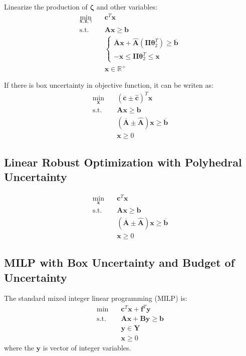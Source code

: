 \documentclass[fleqn,10pt]{wlscirep}
\begin{document}
Linearize the production of $\boldsymbol{\zeta}$ and other variables:
\begin{align}
    \min_{\mathbf{x}, \mathbf{z}, \gamma} \quad& \mathbf{c}^{T} \mathbf{x} \\
    \text{s.t.} \quad & \mathbf{A} \mathbf{x} \geq \mathbf{b} \\ 
    & \begin{cases}
        \overline{\mathbf{A}} \mathbf{x} + \hat{\mathbf{A}} \left(\mathbf{II} \boldsymbol{\theta}_{2}^{T} \right) \geq \overline{\mathbf{b}} \\
        - \mathbf{x} \leq \mathbf{II} \boldsymbol{\theta}_{2}^{T} \leq \mathbf{x}
    \end{cases} \\
    & \mathbf{x} \in \mathbb{R}^{+}
\end{align}

If there is box uncertainty in objective function, it can be writen as:
\begin{align}
    \min_{\mathbf{x}} \quad & \left(\overline{\mathbf{c}} \pm \hat{\mathbf{c}} \right)^T \mathbf{x} \\
    \text{s.t.} \quad & \mathbf{A} \mathbf{x} \geq \mathbf{b} \\
    & \left(\overline{\mathbf{A}} \pm \widehat{\mathbf{A}} \right) \mathbf{x} \geq \overline{\mathbf{b}} \\
    & \mathbf{x} \geq 0
\end{align}

\subsection{Linear Robust Optimization with Polyhedral Uncertainty}

\begin{align}
    \min_{\mathbf{x}} \quad & \mathbf{c}^T \mathbf{x} \\
    \text{s.t.} \quad & \mathbf{A} \mathbf{x} \geq \mathbf{b} \\
    & \left(\overline{\mathbf{A}} \pm \widehat{\mathbf{A}} \right) \mathbf{x} \geq \overline{\mathbf{b}} \\
    & \mathbf{x} \geq 0
\end{align}

\subsection{MILP with Box Uncertainty and Budget of Uncertainty}

The standard mixed integer linear programming (MILP) is:
\begin{align}
    \min \quad& \mathbf{c}^{T} \mathbf{x} + \mathbf{f}^{T} \mathbf{y} \label{eq:1} \\
    \text{s.t.} \quad& \mathbf{A} \mathbf{x} + \mathbf{B} \mathbf{y} \geq \mathbf{b} \label{eq:2} \\ 
    & \mathbf{y} \in \mathbf{Y} \label{eq:3} \\ 
    & \mathbf{x} \geq 0 \label{eq:4} 
\end{align}
where the $\mathbf{y}$ is vector of integer variables.
\end{document}
